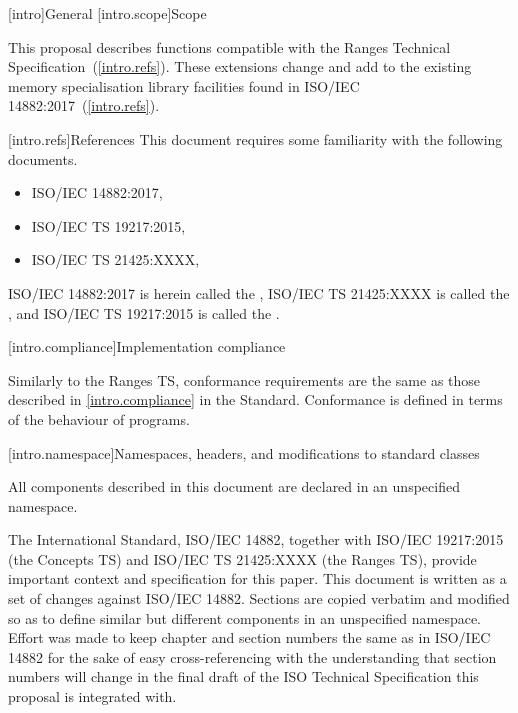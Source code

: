 [intro]{General}
[intro.scope]{Scope}

\pnum
This proposal describes functions compatible with the Ranges Technical
Specification~(\ref{intro.refs}). These extensions change and add to the existing
memory specialisation library facilities found in ISO/IEC 14882:2017~(\ref{intro.refs}).

[intro.refs]{References}
This document requires some familiarity with the following documents.

\begin{itemize}
\item ISO/IEC 14882:2017,   
\item ISO/IEC TS 19217:2015,  
\item ISO/IEC TS 21425:XXXX, 
\end{itemize}

ISO/IEC 14882:2017 is herein called the , ISO/IEC TS 21425:XXXX is called the
, and ISO/IEC TS 19217:2015 is called the .

[intro.compliance]{Implementation compliance}

\pnum
Similarly to the Ranges TS, conformance requirements are the same as those described in
\ref{intro.compliance} in the \Cpp Standard.
\enternote
Conformance is defined in terms of the behaviour of programs.
\exitnote

[intro.namespace]{Namespaces, headers, and modifications to standard classes}

\pnum
All components described in this document are declared in an unspecified namespace.


\pnum
The International Standard, ISO/IEC 14882, together with ISO/IEC 19217:2015 (the Concepts TS) and
ISO/IEC TS 21425:XXXX (the Ranges TS), provide important context and specification for this paper. This
document is written as a set of changes against ISO/IEC 14882. Sections are copied
verbatim and modified so as to define similar but different components in
an unspecified namespace. Effort was made to keep
chapter and section numbers the same as in ISO/IEC 14882 for the sake of easy
cross-referencing with the understanding that section numbers will change in
the final draft of the ISO Technical Specification this proposal is integrated with.

